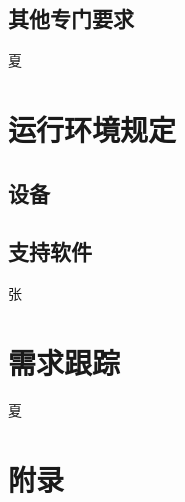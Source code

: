 \documentclass[UTF8]{ctexart}
\begin{document}
\subsection{其他专门要求}
夏
\section{运行环境规定}
\subsection{设备}

\subsection{支持软件}
张
\section{需求跟踪}
夏
\section{附录}
\end{document}
